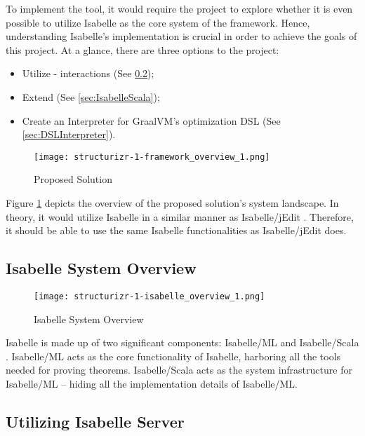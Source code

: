 To implement the tool, it would require the project to explore whether it is even possible to utilize Isabelle as the core system of the framework. 
Hence, understanding Isabelle's implementation is crucial in order to achieve the goals of this project. At a glance, there are three options 
to the project:

\begin{itemize}
    \item Utilize  -  interactions (See \ref{sec:IsabelleServer});
    \item Extend  (See \ref{sec:IsabelleScala});
    \item Create an Interpreter for GraalVM's optimization DSL (See \ref{sec:DSLInterpreter}).
\end{itemize}

\begin{figure}[h]
      \centering
      \texttt{[image: structurizr-1-framework\_overview\_1.png]}
      \caption{Proposed Solution}
      \label{fig:SystemLandscape}
\end{figure}

Figure \ref{fig:SystemLandscape} depicts the overview of the proposed solution's system landscape. In theory, it would utilize Isabelle in a similar 
manner as Isabelle/jEdit \cite{isabelleSystem}. Therefore, it should be able to use the same Isabelle functionalities as Isabelle/jEdit does.

\pagebreak

\subsection{Isabelle System Overview}
\label{sec:IsabelleSystemOverview}

\begin{figure}[h]
      \centering
      \texttt{[image: structurizr-1-isabelle\_overview\_1.png]}
      \caption{Isabelle System Overview}
      \label{fig:IsabelleSystem}
\end{figure}

Isabelle is made up of two significant components: Isabelle/ML and Isabelle/Scala \cite[Ch. 5]{isabelleSystem}. Isabelle/ML acts as the core 
functionality of Isabelle, harboring all the tools needed for proving theorems. Isabelle/Scala acts as the system infrastructure for Isabelle/ML 
-- hiding all the implementation details of Isabelle/ML.

\subsection{Utilizing Isabelle Server}
\label{sec:IsabelleServer}

